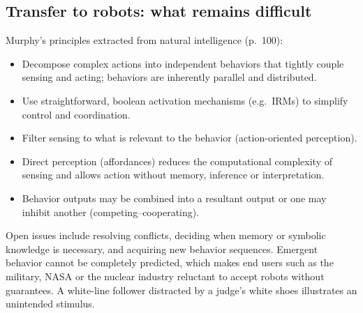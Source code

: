 \subsection{Transfer to robots: what remains difficult}
Murphy's principles extracted from natural intelligence (p.~100):
\begin{itemize}
\item Decompose complex actions into independent behaviors that tightly couple sensing and acting; behaviors are inherently parallel and distributed.
\item Use straightforward, boolean activation mechanisms (e.g.\ IRMs) to simplify control and coordination.
\item Filter sensing to what is relevant to the behavior (action-oriented perception).
\item Direct perception (affordances) reduces the computational complexity of sensing and allows action without memory, inference or interpretation.
\item Behavior outputs may be combined into a resultant output or one may inhibit another (competing--cooperating).
\end{itemize}
Open issues include resolving conflicts, deciding when memory or symbolic knowledge is necessary, and acquiring new behavior sequences. Emergent behavior cannot be completely predicted, which makes end users such as the military, NASA or the nuclear industry reluctant to accept robots without guarantees. A white-line follower distracted by a judge's white shoes illustrates an unintended stimulus.
